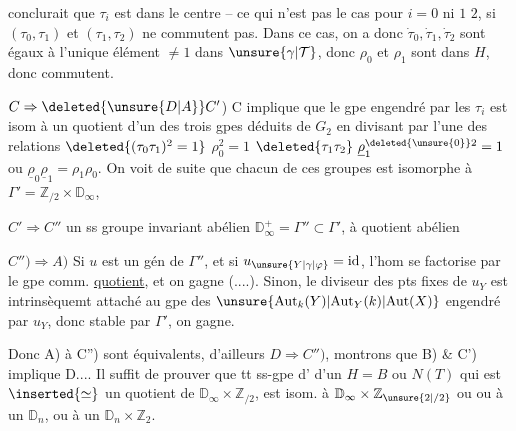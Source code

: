conclurait que $\tau_i$ est dans le centre -- ce qui
n'est pas le cas pour  $i=0$ ni $1$  $2$, si $(\tau_0,\tau_1)$ et
$(\tau_1,\tau_2)$ ne commutent pas. Dans ce cas, on a
donc $\dot\tau_0,\dot\tau_1,\dot\tau_2$ sont égaux à l'unique élément $\ne1$
dans $\unsure{\gamma|\mathcal T}$, donc $\rho_0$ et $\rho_1$ sont dans $H$, donc
commutent. \unsure{$=$}

$C\Rightarrow\deleted{\unsure{D|A}}C'$) C implique que le  gpe engendré
par les $\tau_i$ est isom à un quotient d'un
des trois gpes déduits de $G_2$ en
divisant par l'une des relations $\deleted{(\tau_0\tau_1)^2=1}$ $\rho_0^2=1$
$\deleted{\tau_1\tau_2}\ \underline{\rho}_1^{\deleted{\unsure{0}}2}=1$ ou $\underline{\rho}_0\underline{\rho}_1=\rho_1\rho_0$. On voit  de
suite que chacun de ces groupes est
isomorphe à $\Gamma'=\mathbb Z_{/2}\times\mathbb D_\infty$,

$C'\Rightarrow C''$\quad {}
 un ss groupe invariant abélien  $\mathbb D_\infty^+=\Gamma''\subset\Gamma'$, 
à quotient abélien

$C'')\Rightarrow A)$ Si $u$ est un gén\unsure{,} de $\Gamma''$, et si $u_{\unsure{Y|\gamma|\varphi}}=\mathrm{id}$, l'hom
se factorise par le gpe comm. \uline{quotient}, et on
gagne (....). Sinon, le diviseur des pts fixes de
$u_Y$ est intrinsèquemt attaché  au  gpe des $\unsure{\mathrm{Aut}_k(Y)|\mathrm{Aut}_Y(k)|\mathrm{Aut}(X)}$
engendré par $u_Y$, donc stable par $\Gamma'$, on gagne.

Donc A) à C'') sont équivalents, d'ailleurs
$D\Rightarrow C'')$, montrons que B) \& C') implique
D.... Il suffit de prouver que tt ss-gpe d'
 d'un $H=B$ ou $N(T)$ qui est $\inserted{\simeq}$ un
quotient de $\mathbb D_\infty\times\mathbb Z_{/2}$, est isom. à $\mathbb D_\infty\times\mathbb Z_{\unsure{2|/2}}$ ou
ou à un $\mathbb D_n$, ou à un $\mathbb D_n\times\mathbb Z_2$.
